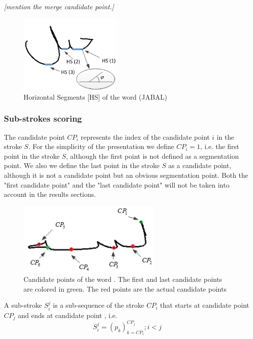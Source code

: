 \documentclass[journal,compsoc]{IEEEtran}
\begin{document}
\emph{[mention the merge candidate point.]}


\begin{figure}
\centering
\includegraphics[width=5cm]{./figures/horizontal_segments}
\caption{Horizontal Segments [HS] of the word (JABAL)}
\label{fig:horizontal_segments}
\end{figure}

\subsubsection{Sub-strokes scoring}
The candidate point $CP_{i}$ represents the index of the candidate point $i$ in the stroke $S$. For the simplicity of the presentation we define $CP_{i}=1$, i.e. the first point in the stroke $S$, although the first point is not defined as a segmentation point. We also we define the last point in the stroke $S$ as a candidate point, although it is not a candidate point but an obvious segmentation point. Both the "first candidate point" and the "last candidate point" will not be taken into account in the results sections.   

\begin{figure}
\centering
\includegraphics[width=7cm]{./figures/candidate_points}
\caption{Candidate points of the word  . The first and last candidate points are colored in green. The red points are the actual candidate points}
\label{fig:candidate_points}
\end{figure}

A sub-stroke $S_{i}^{j}$ is a sub-sequence of the stroke $CP_{i}$ that starts at candidate point $CP_{j}$ and ends at candidate point , i.e.
\begin{equation}
S_{i}^{j}=(p_{k})_{k=CP_{i}}^{CP_{j}}; i<j
\end{equation}
\end{document}
